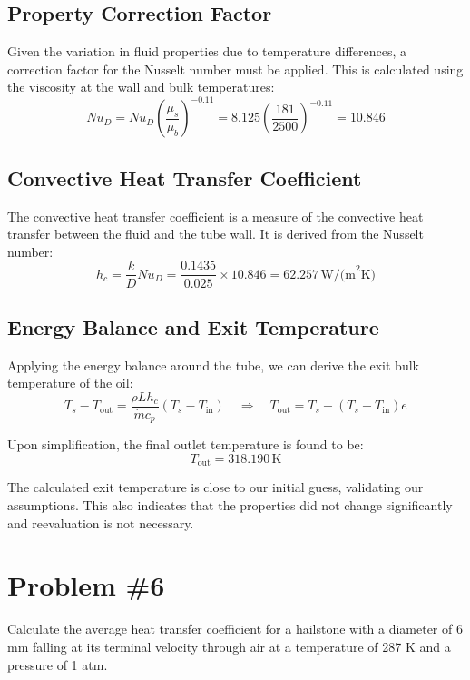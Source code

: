 \documentclass{article}
\numberwithin{equation}{section}
\begin{document}
\subsection*{Property Correction Factor}
Given the variation in fluid properties due to temperature differences, a correction factor for the Nusselt number must be applied. This is calculated using the viscosity at the wall and bulk temperatures:
\begin{equation}
    Nu_{D} = Nu_{D} \left(\frac{\mu_{s}}{\mu_{b}}\right)^{-0.11} = 8.125 \left(\frac{181}{2500}\right)^{-0.11} = 10.846
\end{equation}

\subsection*{Convective Heat Transfer Coefficient}
The convective heat transfer coefficient is a measure of the convective heat transfer between the fluid and the tube wall. It is derived from the Nusselt number:
\begin{equation}
    h_{c} = \frac{k}{D} Nu_{D} = \frac{0.1435}{0.025} \times 10.846 = 62.257 \, \text{W/(m}^2 \text{K)}
\end{equation}

\subsection*{Energy Balance and Exit Temperature}
Applying the energy balance around the tube, we can derive the exit bulk temperature of the oil:
\begin{equation}
    T_{s} - T_{\text{out}} = \frac{\rho L h_{c}}{\dot{m} c_{p}} (T_{s} - T_{\text{in}}) \quad \Rightarrow \quad T_{\text{out}} = T_{s} - (T_{s} - T_{\text{in}})e
\end{equation}

Upon simplification, the final outlet temperature is found to be:
\begin{equation}
    T_{\text{out}} = 318.190 \, \text{K}
\end{equation}

The calculated exit temperature is close to our initial guess, validating our assumptions. This also indicates that the properties did not change significantly and reevaluation is not necessary.

\newpage
\section{Problem \#6}
Calculate the average heat transfer coefficient for a hailstone with a diameter of 6 mm falling at its terminal velocity through air at a temperature of 287 K and a pressure of 1 atm.
\end{document}
